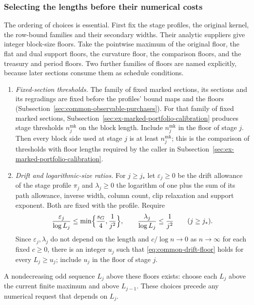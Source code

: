 \subsubsection{Selecting the lengths before their numerical costs}
The ordering of choices is essential. First fix the stage profiles,
the original kernel, the row-bound families and their secondary
widths. Their analytic suppliers give integer block-size floors.
Take the pointwise maximum of the original floor, the flat and
dual support floors, the curvature floor, the comparison floors,
and the treasury and period floors. Two further families of floors
are named explicitly, because later sections consume them as schedule
conditions.
\begin{enumerate}
\item \emph{Fixed-section thresholds.} The family of fixed marked sections,
 its sections and its regradings are fixed before the profiles' bound
 maps and the floors
 (Subsection~\ref{sec:common-observable-purchases}). For that family of fixed marked sections,
 Subsection~\ref{sec:ex-marked-portfolio-calibration} produces stage
 thresholds $n^{\mathrm{mk}}_j$ on the block length. Include
 $n^{\mathrm{mk}}_j$ in the floor of stage $j$. Then every block side
 used at stage $j$ is at least $n^{\mathrm{mk}}_j$; this is the
 comparison of thresholds with floor lengths required by the caller
 in Subsection~\ref{sec:ex-marked-portfolio-calibration}.
\item \emph{Drift and logarithmic-size ratios.} For $j\ge j_*$ let
 $\varepsilon_j\ge0$ be the drift allowance of the stage profile
 $\pi_j$ and $\lambda_j\ge0$ the logarithm of one plus the sum of its
 path allowance, inverse width, column count, clip relaxation and
 support exponent. Both are fixed with the profile. Require
 \begin{equation}\label{eq:common-drift-floor}
  \frac{\varepsilon_j}{\log L_j}\le\min\Bigl\{\frac{s_G}{4},
       \frac1{j^2}\Bigr\},\qquad
  \frac{\lambda_j}{\log L_j}\le\frac1{j^2}\qquad(j\ge j_*).
 \end{equation}
 Since $\varepsilon_j,\lambda_j$ do not depend on the length and
 $c/\log n\to0$ as $n\to\infty$ for each fixed $c\ge0$, there is an
 integer $u_j$ such that \eqref{eq:common-drift-floor} holds for every
 $L_j\ge u_j$; include $u_j$ in the floor of stage $j$.
\end{enumerate}
A nondecreasing odd sequence
$L_j$ above these floors exists: choose each $L_j$ above the
current finite maximum and above $L_{j-1}$. These choices precede
any numerical request that depends on $L_j$.

